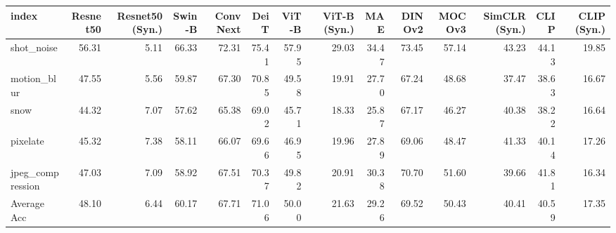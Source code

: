 \begin{tabular}{lrrrrrrrrrrrrr}
\toprule
index & Resnet50 & Resnet50 (Syn.) & Swin-B & ConvNext & DeiT & ViT-B & ViT-B (Syn.) & MAE & DINOv2 & MOCOv3 & SimCLR (Syn.) & CLIP & CLIP (Syn.) \\
\midrule
shot_noise & 56.31 & 5.11 & 66.33 & 72.31 & 75.41 & 57.95 & 29.03 & 34.47 & 73.45 & 57.14 & 43.23 & 44.13 & 19.85 \\
motion_blur & 47.55 & 5.56 & 59.87 & 67.30 & 70.85 & 49.58 & 19.91 & 27.70 & 67.24 & 48.68 & 37.47 & 38.63 & 16.67 \\
snow & 44.32 & 7.07 & 57.62 & 65.38 & 69.02 & 45.71 & 18.33 & 25.87 & 67.17 & 46.27 & 40.38 & 38.22 & 16.64 \\
pixelate & 45.32 & 7.38 & 58.11 & 66.07 & 69.66 & 46.95 & 19.96 & 27.89 & 69.06 & 48.47 & 41.33 & 40.14 & 17.26 \\
jpeg_compression & 47.03 & 7.09 & 58.92 & 67.51 & 70.37 & 49.82 & 20.91 & 30.38 & 70.70 & 51.60 & 39.66 & 41.81 & 16.34 \\
Average Acc & 48.10 & 6.44 & 60.17 & 67.71 & 71.06 & 50.00 & 21.63 & 29.26 & 69.52 & 50.43 & 40.41 & 40.59 & 17.35 \\
\bottomrule
\end{tabular}
